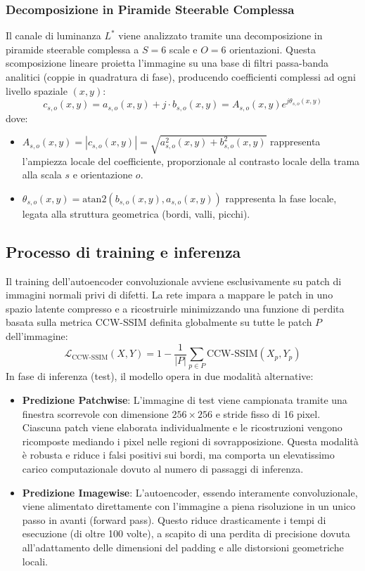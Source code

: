 \subsubsection{Decomposizione in Piramide Steerable Complessa}
Il canale di luminanza $L^*$ viene analizzato tramite una decomposizione in piramide steerable complessa a $S=6$ scale e $O=6$ orientazioni. Questa scomposizione lineare proietta l'immagine su una base di filtri passa-banda analitici (coppie in quadratura di fase), producendo coefficienti complessi ad ogni livello spaziale $(x,y)$:
\begin{equation}
    c_{s,o}(x, y) = a_{s,o}(x, y) + j \cdot b_{s,o}(x, y) = A_{s,o}(x, y) e^{j \theta_{s,o}(x, y)}
\end{equation}
dove:
\begin{itemize}
    \item $A_{s,o}(x, y) = |c_{s,o}(x, y)| = \sqrt{a_{s,o}^2(x, y) + b_{s,o}^2(x, y)}$ rappresenta l'ampiezza locale del coefficiente, proporzionale al contrasto locale della trama alla scala $s$ e orientazione $o$.
    \item $\theta_{s,o}(x, y) = \text{atan2}(b_{s,o}(x, y), a_{s,o}(x, y))$ rappresenta la fase locale, legata alla struttura geometrica (bordi, valli, picchi).
\end{itemize}

\subsection{Processo di training e inferenza}
Il training dell'autoencoder convoluzionale avviene esclusivamente su patch di immagini normali privi di difetti. La rete impara a mappare le patch in uno spazio latente compresso e a ricostruirle minimizzando una funzione di perdita basata sulla metrica CCW-SSIM definita globalmente su tutte le patch $P$ dell'immagine:
\begin{equation}
    \mathcal{L}_{\text{CCW-SSIM}}(X, Y) = 1 - \frac{1}{|P|} \sum_{p \in P} \text{CCW-SSIM}(X_p, Y_p)
\end{equation}
In fase di inferenza (test), il modello opera in due modalità alternative:
\begin{itemize}
    \item \textbf{Predizione Patchwise}: L'immagine di test viene campionata tramite una finestra scorrevole con dimensione $256 \times 256$ e stride fisso di 16 pixel. Ciascuna patch viene elaborata individualmente e le ricostruzioni vengono ricomposte mediando i pixel nelle regioni di sovrapposizione. Questa modalità è robusta e riduce i falsi positivi sui bordi, ma comporta un elevatissimo carico computazionale dovuto al numero di passaggi di inferenza.
    \item \textbf{Predizione Imagewise}: L'autoencoder, essendo interamente convoluzionale, viene alimentato direttamente con l'immagine a piena risoluzione in un unico passo in avanti (forward pass). Questo riduce drasticamente i tempi di esecuzione (di oltre 100 volte), a scapito di una perdita di precisione dovuta all'adattamento delle dimensioni del padding e alle distorsioni geometriche locali.
\end{itemize}

